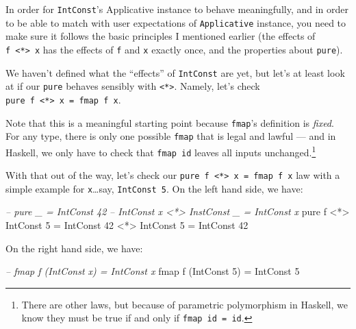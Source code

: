 \documentclass[]{article}
\newenvironment{Shaded}{}{}
\newcommand{\CommentTok}[1]{\textcolor[rgb]{0.38,0.63,0.69}{\textit{#1}}}
\newcommand{\DataTypeTok}[1]{\textcolor[rgb]{0.56,0.13,0.00}{#1}}
\newcommand{\DecValTok}[1]{\textcolor[rgb]{0.25,0.63,0.44}{#1}}
\newcommand{\FunctionTok}[1]{\textcolor[rgb]{0.02,0.16,0.49}{#1}}
\newcommand{\NormalTok}[1]{#1}
\begin{document}
In order for \texttt{IntConst}'s Applicative instance to behave meaningfully,
and in order to be able to match with user expectations of \texttt{Applicative}
instance, you need to make sure it follows the basic principles I mentioned
earlier (the effects of \texttt{f\ \textless{}*\textgreater{}\ x} has the
effects of \texttt{f} and \texttt{x} exactly once, and the properties about
\texttt{pure}).

We haven't defined what the ``effects'' of \texttt{IntConst} are yet, but let's
at least look at if our \texttt{pure} behaves sensibly with
\texttt{\textless{}*\textgreater{}}. Namely, let's check
\texttt{pure\ f\ \textless{}*\textgreater{}\ x\ =\ fmap\ f\ x}.

Note that this is a meaningful starting point because \texttt{fmap}'s definition
is \emph{fixed}. For any type, there is only one possible \texttt{fmap} that is
legal and lawful --- and in Haskell, we only have to check that
\texttt{fmap\ id} leaves all inputs unchanged.\footnote{There are other laws,
  but because of parametric polymorphism in Haskell, we know they must be true
  if and only if \texttt{fmap\ id\ =\ id}.}

With that out of the way, let's check our
\texttt{pure\ f\ \textless{}*\textgreater{}\ x\ =\ fmap\ f\ x} law with a simple
example for \texttt{x}\ldots{}say, \texttt{IntConst\ 5}. On the left hand side,
we have:

\begin{Shaded}
\begin{Highlighting}[]
\CommentTok{-- pure _                     = IntConst 42}
\CommentTok{-- IntConst x <*> InstConst _ = IntConst x}
\NormalTok{pure f }\FunctionTok{<*>} \DataTypeTok{IntConst} \DecValTok{5} \FunctionTok{=} \DataTypeTok{IntConst} \DecValTok{42} \FunctionTok{<*>} \DataTypeTok{IntConst} \DecValTok{5}
                      \FunctionTok{=} \DataTypeTok{IntConst} \DecValTok{42}
\end{Highlighting}
\end{Shaded}

On the right hand side, we have:

\begin{Shaded}
\begin{Highlighting}[]
\CommentTok{-- fmap f (IntConst x) = IntConst x}
\NormalTok{fmap f (}\DataTypeTok{IntConst} \DecValTok{5}\NormalTok{) }\FunctionTok{=} \DataTypeTok{IntConst} \DecValTok{5}
\end{Highlighting}
\end{Shaded}
\end{document}
